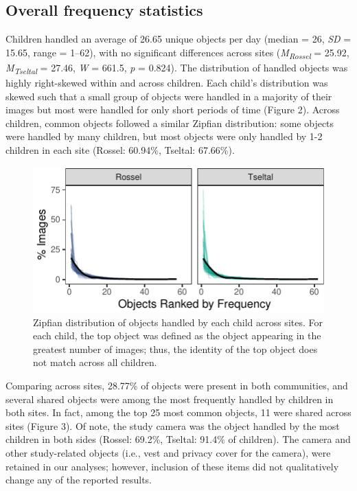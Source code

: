 \documentclass[10pt, letterpaper]{article}
\newenvironment{CodeChunk}{}{}
\begin{document}
\hypertarget{overall-frequency-statistics}{%
\subsection{Overall frequency
statistics}\label{overall-frequency-statistics}}

Children handled an average of 26.65 unique objects per day (median =
26, \emph{SD} = 15.65, range = 1--62), with no significant differences
across sites (\emph{M}\textsubscript{\emph{Rossel}} = 25.92,
\emph{M}\textsubscript{\emph{Tseltal}} = 27.46, \emph{W} = 661.5,
\emph{p} = 0.824). The distribution of handled objects was highly
right-skewed within and across children. Each child's distribution was
skewed such that a small group of objects were handled in a majority of
their images but most were handled for only short periods of time
(Figure 2). Across children, common objects followed a similar Zipfian
distribution: some objects were handled by many children, but most
objects were only handled by 1-2 children in each site (Rossel: 60.94\%,
Tseltal: 67.66\%).

\begin{CodeChunk}
\begin{figure}[h]

{\centering \includegraphics{figs/zipfian-objects-fig-1} 

}

\caption[Zipfian distribution of objects handled by each child across sites]{Zipfian distribution of objects handled by each child across sites. For each child, the top object was defined as the object appearing in the greatest number of images; thus, the identity of the top object does not match across all children.}\label{fig:zipfian-objects-fig}
\end{figure}
\end{CodeChunk}

Comparing across sites, 28.77\% of objects were present in both
communities, and several shared objects were among the most frequently
handled by children in both sites. In fact, among the top 25 most common
objects, 11 were shared across sites (Figure 3). Of note, the study
camera was the object handled by the most children in both sides
(Rossel: 69.2\%, Tseltal: 91.4\% of children). The camera and other
study-related objects (i.e., vest and privacy cover for the camera),
were retained in our analyses; however, inclusion of these items did not
qualitatively change any of the reported results.
\end{document}
